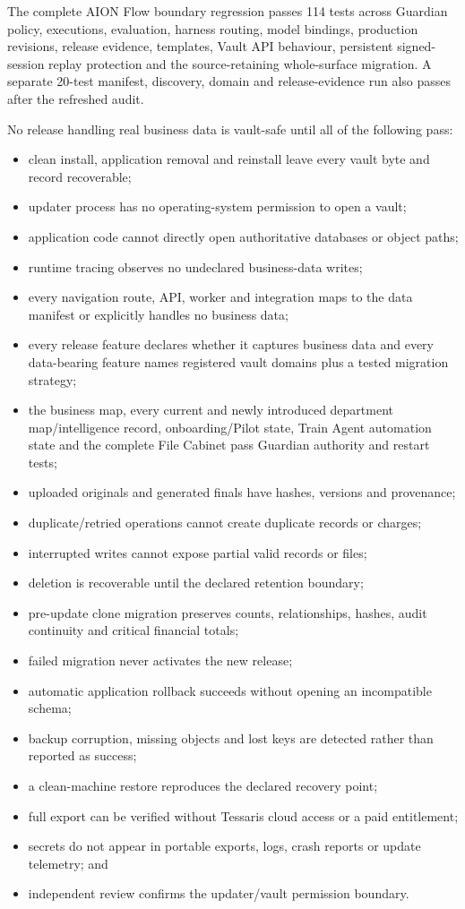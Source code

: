 \documentclass[11pt]{article}
\begin{document}
The complete AION Flow boundary regression passes 114 tests across Guardian policy, executions, evaluation, harness routing, model bindings, production revisions, release evidence, templates, Vault API behaviour, persistent signed-session replay protection and the source-retaining whole-surface migration. A separate 20-test manifest, discovery, domain and release-evidence run also passes after the refreshed audit.

No release handling real business data is vault-safe until all of the following pass:

\begin{itemize}
  \item clean install, application removal and reinstall leave every vault byte and record recoverable;
  \item updater process has no operating-system permission to open a vault;
  \item application code cannot directly open authoritative databases or object paths;
  \item runtime tracing observes no undeclared business-data writes;
  \item every navigation route, API, worker and integration maps to the data manifest or explicitly handles no business data;
  \item every release feature declares whether it captures business data and every data-bearing feature names registered vault domains plus a tested migration strategy;
  \item the business map, every current and newly introduced department map/intelligence record, onboarding/Pilot state, Train Agent automation state and the complete File Cabinet pass Guardian authority and restart tests;
  \item uploaded originals and generated finals have hashes, versions and provenance;
  \item duplicate/retried operations cannot create duplicate records or charges;
  \item interrupted writes cannot expose partial valid records or files;
  \item deletion is recoverable until the declared retention boundary;
  \item pre-update clone migration preserves counts, relationships, hashes, audit continuity and critical financial totals;
  \item failed migration never activates the new release;
  \item automatic application rollback succeeds without opening an incompatible schema;
  \item backup corruption, missing objects and lost keys are detected rather than reported as success;
  \item a clean-machine restore reproduces the declared recovery point;
  \item full export can be verified without Tessaris cloud access or a paid entitlement;
  \item secrets do not appear in portable exports, logs, crash reports or update telemetry; and
  \item independent review confirms the updater/vault permission boundary.
\end{itemize}
\end{document}
